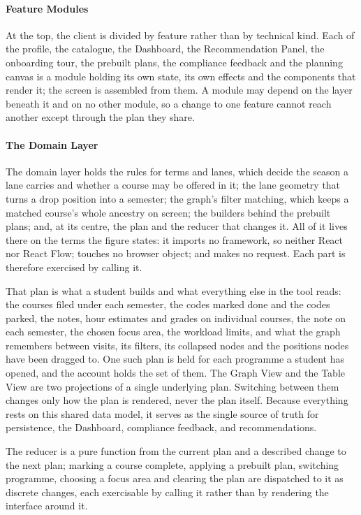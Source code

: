 \paragraph{Feature Modules}
At the top, the client is divided by feature rather than by technical kind. Each of the profile, the catalogue, the Dashboard, the Recommendation Panel, the onboarding tour, the prebuilt plans, the compliance feedback and the planning canvas is a module holding its own state, its own effects and the components that render it; the screen is assembled from them. A module may depend on the layer beneath it and on no other module, so a change to one feature cannot reach another except through the plan they share.

\paragraph{The Domain Layer}
The domain layer holds the rules for terms and lanes, which decide the season a lane carries and whether a course may be offered in it; the lane geometry that turns a drop position into a semester; the graph's filter matching, which keeps a matched course's whole ancestry on screen; the builders behind the prebuilt plans; and, at its centre, the plan and the reducer that changes it. All of it lives there on the terms the figure states: it imports no framework, so neither React nor React Flow; touches no browser object; and makes no request. Each part is therefore exercised by calling it.

That plan is what a student builds and what everything else in the tool reads: the courses filed under each semester, the codes marked done and the codes parked, the notes, hour estimates and grades on individual courses, the note on each semester, the chosen focus area, the workload limits, and what the graph remembers between visits, its filters, its collapsed nodes and the positions nodes have been dragged to. One such plan is held for each programme a student has opened, and the account holds the set of them. The Graph View and the Table View are two projections of a single underlying plan. Switching between them changes only how the plan is rendered, never the plan itself. Because everything rests on this shared data model, it serves as the single source of truth for persistence, the Dashboard, compliance feedback, and recommendations.

The reducer is a pure function from the current plan and a described change to the next plan; marking a course complete, applying a prebuilt plan, switching programme, choosing a focus area and clearing the plan are dispatched to it as discrete changes, each exercisable by calling it rather than by rendering the interface around it.


